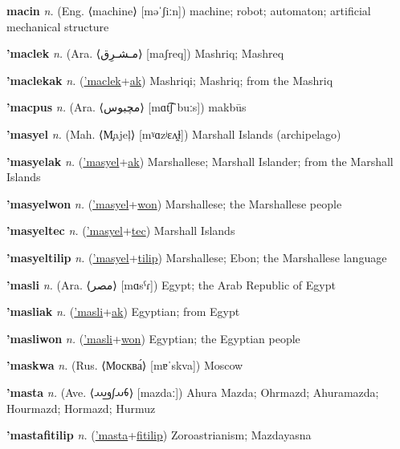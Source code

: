 \textbf{\hypertarget{macin}{macin}} \textit{n.} (Eng. ⟨machine⟩ [məˈʃiːn])
machine; robot; automaton; artificial mechanical structure

\textbf{\hypertarget{'maclek}{'maclek}} \textit{n.} (Ara. ⟨{\arabics{}مـشـرِق‎‎}⟩ [maʃreq])
Mashriq; Mashreq

\textbf{\hypertarget{'maclekak}{'maclekak}} \textit{n.} (\hyperlink{'maclek}{'maclek}+\allowbreak \hyperlink{ak}{ak})
Mashriqi; Mashriq; from the Mashriq

\textbf{\hypertarget{'macpus}{'macpus}} \textit{n.} (Ara. ⟨{\arabics{}مچبوس}⟩ [mɑt͡ʃˈbuːs])
makbūs

\textbf{\hypertarget{'masyel}{'masyel}} \textit{n.} (Mah. ⟨M̧ajeļ⟩ [mˠɑzʲɛʌ̯ɫ])
Marshall Islands (archipelago)

\textbf{\hypertarget{'masyelak}{'masyelak}} \textit{n.} (\hyperlink{'masyel}{'masyel}+\allowbreak \hyperlink{ak}{ak})
Marshallese; Marshall Islander; from the Marshall Islands

\textbf{\hypertarget{'masyelwon}{'masyelwon}} \textit{n.} (\hyperlink{'masyel}{'masyel}+\allowbreak \hyperlink{won}{won})
Marshallese; the Marshallese people

\textbf{\hypertarget{'masyeltec}{'masyeltec}} \textit{n.} (\hyperlink{'masyel}{'masyel}+\allowbreak \hyperlink{tec}{tec})
Marshall Islands

\textbf{\hypertarget{'masyeltilip}{'masyeltilip}} \textit{n.} (\hyperlink{'masyel}{'masyel}+\allowbreak \hyperlink{tilip}{tilip})
Marshallese; Ebon; the Marshallese language

\textbf{\hypertarget{'masli}{'masli}} \textit{n.} (Ara. ⟨{\arabics{}مصر}⟩ [mɑsˁɾ])
Egypt; the Arab Republic of Egypt

\textbf{\hypertarget{'masliak}{'masliak}} \textit{n.} (\hyperlink{'masli}{'masli}+\allowbreak \hyperlink{ak}{ak})
Egyptian; from Egypt

\textbf{\hypertarget{'masliwon}{'masliwon}} \textit{n.} (\hyperlink{'masli}{'masli}+\allowbreak \hyperlink{won}{won})
Egyptian; the Egyptian people

\textbf{\hypertarget{'maskwa}{'maskwa}} \textit{n.} (Rus. ⟨Москва́⟩ [mɐˈskva])
Moscow

\textbf{\hypertarget{'masta}{'masta}} \textit{n.} (Ave. ⟨{\avestan{}𐬨𐬀𐬰𐬛𐬁}⟩ [mazdaː])
Ahura Mazda; Ohrmazd; Ahuramazda; Hourmazd; Hormazd; Hurmuz

\textbf{\hypertarget{'mastafitilip}{'mastafitilip}} \textit{n.} (\hyperlink{'masta}{'masta}+\allowbreak \hyperlink{fitilip}{fitilip})
Zoroastrianism; Mazdayasna

